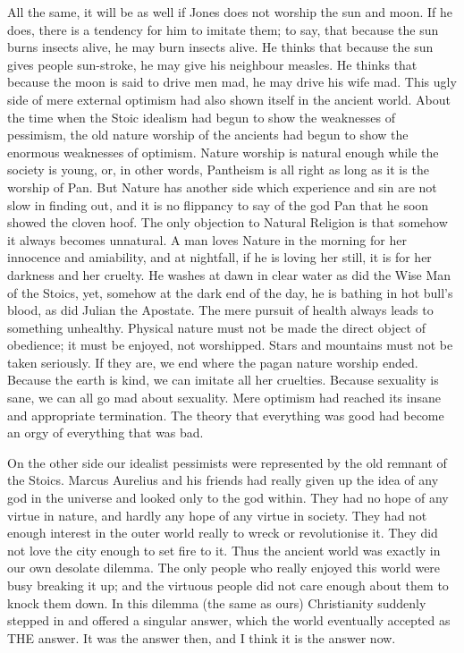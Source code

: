 All the same, it will be as well if Jones does not worship the sun and moon. If he does, there is a tendency for him to imitate them; to say, that because the sun burns insects alive, he may burn insects alive. He thinks that because the sun gives people sun-stroke, he may give his neighbour measles. He thinks that because the moon is said to drive men mad, he may drive his wife mad. This ugly side of mere external optimism had also shown itself in the ancient world. About the time when the Stoic idealism had begun to show the weaknesses of pessimism, the old nature worship of the ancients had begun to show the enormous weaknesses of optimism. Nature worship is natural enough while the society is young, or, in other words, Pantheism is all right as long as it is the worship of Pan. But Nature has another side which experience and sin are not slow in finding out, and it is no flippancy to say of the god Pan that he soon showed the cloven hoof. The only objection to Natural Religion is that somehow it always becomes unnatural. A man loves Nature in the morning for her innocence and amiability, and at nightfall, if he is loving her still, it is for her darkness and her cruelty. He washes at dawn in clear water as did the Wise Man of the Stoics, yet, somehow at the dark end of the day, he is bathing in hot bull’s blood, as did Julian the Apostate. The mere pursuit of health always leads to something unhealthy. Physical nature must not be made the direct object of obedience; it must be enjoyed, not worshipped. Stars and mountains must not be taken seriously. If they are, we end where the pagan nature worship ended. Because the earth is kind, we can imitate all her cruelties. Because sexuality is sane, we can all go mad about sexuality. Mere optimism had reached its insane and appropriate termination. The theory that everything was good had become an orgy of everything that was bad.

On the other side our idealist pessimists were represented by the old remnant of the Stoics. Marcus Aurelius and his friends had really given up the idea of any god in the universe and looked only to the god within. They had no hope of any virtue in nature, and hardly any hope of any virtue in society. They had not enough interest in the outer world really to wreck or revolutionise it. They did not love the city enough to set fire to it. Thus the ancient world was exactly in our own desolate dilemma. The only people who really enjoyed this world were busy breaking it up; and the virtuous people did not care enough about them to knock them down. In this dilemma (the same as ours) Christianity suddenly stepped in and offered a singular answer, which the world eventually accepted as THE answer. It was the answer then, and I think it is the answer now.

